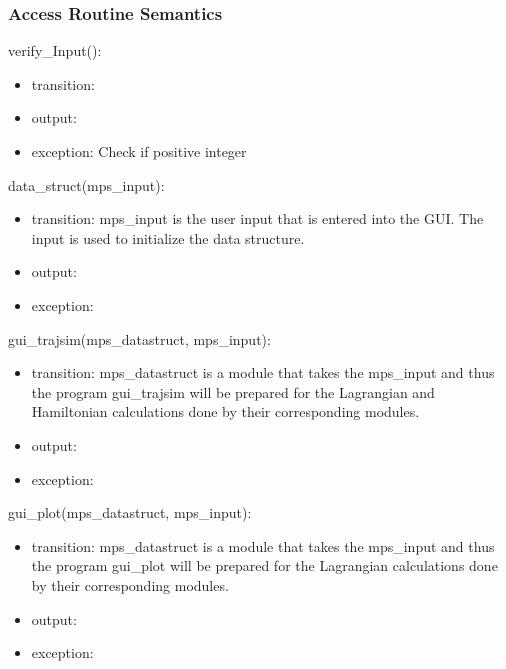 \documentclass[12pt, titlepage]{article}
\begin{document}
\subsubsection{Access Routine Semantics}

\noindent verify\_Input():
\begin{itemize}
\item transition:  
\item output:  
\item exception: Check if positive integer
\end{itemize}

\noindent data\_struct(mps\_input):
\begin{itemize}
\item transition: mps\_input is the user input that is entered into the GUI. 
The input is used to initialize the data structure. 
\item output:  
\item exception:  
\end{itemize}

\noindent gui\_trajsim(mps\_datastruct, mps\_input):
\begin{itemize}
\item transition: mps\_datastruct is a module that takes the mps\_input and 
thus the program gui\_trajsim will be prepared for the Lagrangian and 
Hamiltonian calculations done by their corresponding modules.
\item output:  
\item exception:  
\end{itemize}

\noindent gui\_plot(mps\_datastruct, mps\_input):
\begin{itemize}
\item transition: mps\_datastruct is a module that takes the mps\_input and 
thus the program gui\_plot will be prepared for the Lagrangian 
calculations done by their corresponding modules.
\item output:  
\item exception:  
\end{itemize}

\end{document}
